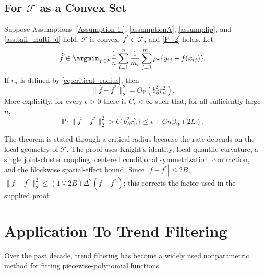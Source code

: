 \documentclass[twoside,11pt]{article}
\newenvironment{revision}{\color{revisionred}}{}
\begin{document}
\subsection{For $\mathcal F$ as a Convex Set}
\begin{theorem}\label{Theorem_1}
\begin{revision}
Suppose Assumptions~\ref{Assumption 1.}, \ref{assumptionA}, \ref{assump:lip}, and \ref{ass:tail_multi_d} hold, $\mathcal F$ is convex, $f^*\in\mathcal F$, and \eqref{F_2} holds. Let
\begin{equation}
 \widehat f\in\argmin_{f\in\mathcal F}
 \frac1n\sum_{i=1}^n\frac1{m_i}\sum_{j=1}^{m_i}
 \rho_\tau\{y_{ij}-f(x_{ij})\}.                              \label{main_est}
\end{equation}
If $r_n$ is defined by \eqref{eq:critical_radius}, then
\begin{equation}
 \|\widehat f-f^*\|_2^2=O_{\mathbb P}(b_B^2r_n^2).           \label{eq:general_convex_rate_full}
\end{equation}
More explicitly, for every $\epsilon>0$ there is $C_\epsilon<\infty$ such that, for all sufficiently large $n$,
\[
 \mathbb P\{\|\widehat f-f^*\|_2^2>C_\epsilon b_B^2r_n^2\}
 \le\epsilon+C n\beta_W(2L).
\]
\end{revision}
\end{theorem}

\begin{revision}
The theorem is stated through a critical radius because the rate depends on the local geometry of $\mathcal F$. The proof uses Knight's identity, local quantile curvature, a single joint-cluster coupling, centered conditional symmetrization, contraction, and the blockwise spatial-effect bound. Since $|f-f^*|\le2B$,
$\|f-f^*\|_2^2\le(1\vee2B)\Delta^2(f-f^*)$; this corrects the factor used in the supplied proof.
\end{revision}


\section{Application To Trend Filtering}

Over the past decade, trend filtering has become a widely used nonparametric method for fitting piecewise-polynomial functions \citep{rudin1992nonlinear,mammen1997locally,tibshirani2005sparsity,kim2009ell_1,tibshirani2014adaptive}.
\end{document}
